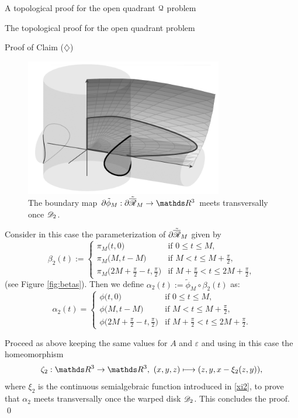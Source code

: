 \documentclass[11pt, a4paper, english, twoside, notitlepage, openright]{report}
\begin{document}
\begin{chapter}{A topological proof for the open quadrant $\mathcal{Q}$ problem}
\begin{section}{The topological proof for the open quadrant problem}
\begin{subsection}{Proof of Claim ($\diamondsuit$)}
\begin{lemma}
\begin{Proof}
\begin{figure}[!ht]
\begin{center}
\includegraphics[height=6cm]{plots/ch3_01_A2.png}
\end{center}
\caption{The boundary map $\partial\tilde{\phi}_M:\partial\tilde{\overline{\Rr}}_M\rightarrow\R^3$ meets transversally once $\mathscr{D}_2$.}
\end{figure}

\vspace{1mm}

Consider in this case the parameterization of $\partial\tilde{\overline{\mathscr{R}}}_M$ given by
$$
\beta_2(t):=
\begin{cases}
\pi_M\big(t,0\big) &\text{if $0\le t\le M$},\\
\pi_M\big(M,t-M\big) &\text{if $M<t\le M+\frac{\pi}{2}$},\\
\pi_M\big(2M+\frac{\pi}{2}-t,\frac{\pi}{2}\big) &\text{if $M+\frac{\pi}{2}<t\le 2M+\frac{\pi}{2}$},
\end{cases}
$$ 
(see Figure \ref{fig:betas}). Then we define $\alpha_2(t):=\tilde{\phi}_M\circ\beta_2(t)$ as:
$$
\alpha_2(t) =
\begin{cases}
\phi\big(t,0\big) &\text{if $0\le t\le M$},\\
\phi\big(M,t-M\big) &\text{if $M<t\le M+\frac{\pi}{2}$},\\
\phi\big(2M+\frac{\pi}{2}-t,\frac{\pi}{2}\big) &\text{if $M+\frac{\pi}{2}<t\le 2M+\frac{\pi}{2}$}.
\end{cases}
$$ 

Proceed as above keeping the same values for $A$ and $\varepsilon$ and using in this case the homeomorphism
$$
\zeta_2:\R^3\to\R^3,\ (x,y,z)\longmapsto(z,y,x-\xi_2(z,y)),
$$
where $\xi_2$ is the continuous semialgebraic function introduced in \eqref{xi2}, to prove that $\alpha_2$ meets transversally once the warped disk $\mathscr{D}_2$. This concludes the proof.
\qed
\end{Proof}
\end{lemma}


\end{subsection}
\end{section}
\end{chapter}
\end{document}
